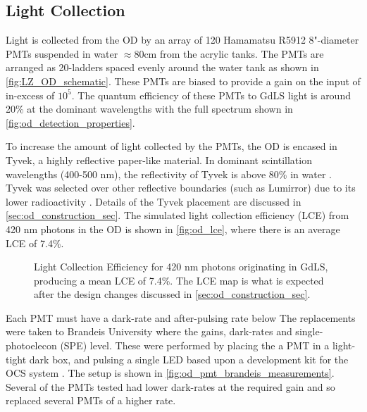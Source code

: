 \subsection{Light Collection}
\par
Light is collected from the OD by an array of 120 Hamamatsu R5912 8"-diameter PMTs suspended in water $\approx$80cm from the acrylic tanks.
The PMTs are arranged as 20-ladders spaced evenly around the water tank as shown in \autoref{fig:LZ_OD_schematic}.
These PMTs are biased to provide a gain on the input of in-excess of $10^{5}$.
The quantum efficiency of these PMTs to GdLS light is around 20\% at the dominant wavelengths with the full spectrum shown in \autoref{fig:od_detection_properties}.

\par
To increase the amount of light collected by the PMTs, the OD is encased in Tyvek, a highly reflective paper-like material.
In dominant scintillation wavelengths (400-500 nm), the reflectivity of Tyvek is above 80\% in water \cite{tyvek_thesis_ref,tyvek_reflectivity_ref}. 
Tyvek was selected over other reflective boundaries (such as Lumirror{\texttrademark}) due to its lower radioactivity \cite{LZ_assay_ref}.
Details of the Tyvek placement are discussed in \autoref{sec:od_construction_sec}.
The simulated light collection efficiency (LCE) from 420 nm photons in the OD is shown in \autoref{fig:od_lce}, where there is an average LCE of 7.4\%.

\begin{figure}
\centering
\resizebox{\textwidth}{!}{

}
\caption[Light Collection Efficiency for 420 nm photons originating in GdLS]{Light Collection Efficiency for 420 nm photons originating in GdLS, producing a mean LCE of 7.4\%.
The LCE map is what is expected after the design changes discussed in \autoref{sec:od_construction_sec}.}
\label{fig:od_lce}
\end{figure}

%

\iffalse

\par
Each PMT must have a dark-rate and after-pulsing rate below 
The replacements were taken to Brandeis University where the gains, dark-rates and single-photoelecon (SPE) level.
These were performed by placing the a PMT in a light-tight dark box, and pulsing a single LED based upon a development kit for the OCS system \cite{lz_ocs_system_ref}.
The setup is shown in \autoref{fig:od_pmt_brandeis_measurements}.
Several of the PMTs tested had lower dark-rates at the required gain and so replaced several PMTs of a higher rate.

